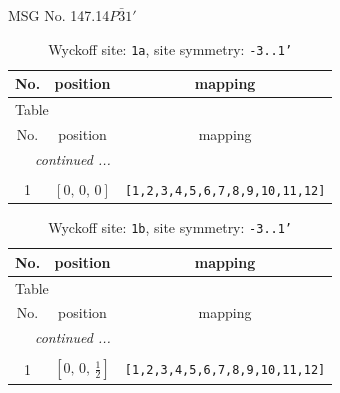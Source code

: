 \documentclass[fleqn,8pt]{jsarticle}
\begin{document}
\setcounter{MaxMatrixCols}{32}

\renewcommand{\tablename}{Table~}
\renewcommand{\figurename}{Figure~}
\begin{center}
\LARGE
MSG No. 147.14\quad$P\bar{3}1'$
\end{center}
\renewcommand{\arraystretch}{1.2}
\begin{longtable}{ccc}
\caption{Wyckoff site: {\tt 1a}, site symmetry: {\tt -3..1'}}
 \\
 \hline \hline
No. & position & mapping \\ \hline \endfirsthead

\multicolumn{2}{l}{\tablename\ \thetable{}} \\
 \hline \hline
No. & position & mapping \\ \hline \endhead

 \hline \hline
\multicolumn{2}{r}{\footnotesize\it continued ...} \\ \endfoot

 \hline \hline
\multicolumn{2}{r}{} \\ \endlastfoot

1 & $\left[ 0,\, 0,\, 0 \right]$ & {\tt [1,2,3,4,5,6,7,8,9,10,11,12]} \\
\end{longtable}
\renewcommand{\arraystretch}{1.2}
\begin{longtable}{ccc}
\caption{Wyckoff site: {\tt 1b}, site symmetry: {\tt -3..1'}}
 \\
 \hline \hline
No. & position & mapping \\ \hline \endfirsthead

\multicolumn{2}{l}{\tablename\ \thetable{}} \\
 \hline \hline
No. & position & mapping \\ \hline \endhead

 \hline \hline
\multicolumn{2}{r}{\footnotesize\it continued ...} \\ \endfoot

 \hline \hline
\multicolumn{2}{r}{} \\ \endlastfoot

1 & $\left[ 0,\, 0,\, \frac{1}{2} \right]$ & {\tt [1,2,3,4,5,6,7,8,9,10,11,12]} \\
\end{longtable}
\renewcommand{\arraystretch}{1.2}
\end{document}
